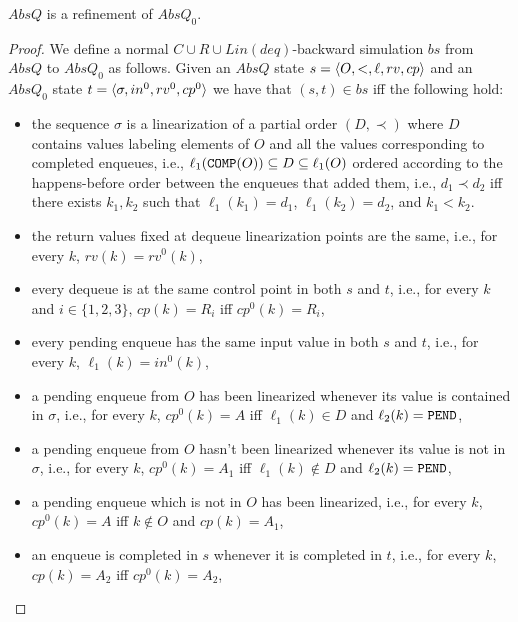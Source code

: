 %
\begin{lemma} 
$AbsQ$ is a refinement of $AbsQ_0$.
\end{lemma}
\begin{proof}
We define a normal $C\cup R\cup Lin(deq)$-backward simulation $bs$ from $AbsQ$ to $AbsQ_0$ as follows. Given an $AbsQ$ state $s=\langle {O,<,\ell,rv,cp} \rangle$ and an $AbsQ_0$ state $t=\langle {\sigma,in^0,rv^0,cp^0} \rangle$ we have that $(s,t)\in bs$ iff the following hold:
\begin{itemize}
	\item the sequence $\sigma$ is a linearization of a partial order $(D,\prec)$ where $D$ contains values labeling elements of $O$ and all the values corresponding to completed enqueues, i.e., $\ell_1({\tt COMP}(O))\subseteq D\subseteq \ell_1(O)$ ordered according to the happens-before order between the enqueues that added them, i.e., $d_1\prec d_2$ if{f} there exists $k_1,k_2$ such that $\ell_1(k_1)=d_1$, $\ell_1(k_2)=d_2$, and $k_1 < k_2$.
	\item the return values fixed at dequeue linearization points are the same, i.e., for every $k$, $rv(k)=rv^0(k)$,
	\item every dequeue is at the same control point in both $s$ and $t$, i.e., for every $k$ and $i\in \{1,2,3\}$, $cp(k)=R_i$ iff $cp^0(k)=R_i$,
	\item every pending enqueue has the same input value in both $s$ and $t$, i.e., for every $k$, $\ell_1(k)=in^0(k)$,
	\item a pending enqueue from $O$ has been linearized whenever its value is contained in $\sigma$, i.e., for every $k$, $cp^0(k)=A$ iff $\ell_1(k)\in D$ and $\ell_2(k)={\tt PEND}$, 
	\item a pending enqueue from $O$ hasn't been linearized whenever its value is not in $\sigma$, i.e., for every $k$, $cp^0(k)=A_1$ iff $\ell_1(k)\not\in D$ and $\ell_2(k)={\tt PEND}$, 
	\item a pending enqueue which is not in $O$ has been linearized, i.e., for every $k$, $cp^0(k)=A$ iff $k\not\in O$ and $cp(k)=A_1$, 
	\item an enqueue is completed in $s$ whenever it is completed in $t$, i.e., for every $k$, $cp(k)=A_2$ iff $cp^0(k)=A_2$,
\end{itemize}


\end{proof}
